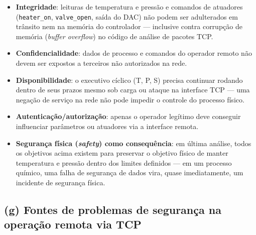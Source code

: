 \documentclass[12pt,a4paper]{article}
\newcommand{\vv}[1]{\texttt{#1}}
\begin{document}
\begin{itemize}[leftmargin=1.7cm]
  \item \textbf{Integridade}: leituras de temperatura e press\~ao e comandos de atuadores
  (\vv{heater\_on}, \vv{valve\_open}, sa\'ida do DAC) n\~ao podem ser adulterados em
  tr\^ansito nem na mem\'oria do controlador --- inclusive contra corrup\c{c}\~ao de
  mem\'oria (\emph{buffer overflow}) no c\'odigo de an\'alise de pacotes TCP.
  \item \textbf{Confidencialidade}: dados de processo e comandos do operador remoto n\~ao
  devem ser expostos a terceiros n\~ao autorizados na rede.
  \item \textbf{Disponibilidade}: o executivo c\'iclico (T, P, S) precisa continuar
  rodando dentro de seus prazos mesmo sob carga ou ataque na interface TCP --- uma nega\c{c}\~ao
  de servi\c{c}o na rede n\~ao pode impedir o controle do processo f\'isico.
  \item \textbf{Autentica\c{c}\~ao/autoriza\c{c}\~ao}: apenas o operador leg\'itimo deve
  conseguir influenciar par\^ametros ou atuadores via a interface remota.
  \item \textbf{Seguran\c{c}a f\'isica (\emph{safety}) como consequ\^encia}: em \'ultima
  an\'alise, todos os objetivos acima existem para preservar o objetivo f\'isico de manter
  temperatura e press\~ao dentro dos limites definidos --- em um processo qu\'imico, uma
  falha de seguran\c{c}a de dados vira, quase imediatamente, um incidente de seguran\c{c}a
  f\'isica.
\end{itemize}

\subsection{(g) Fontes de problemas de seguran\c{c}a na opera\c{c}\~ao remota via TCP}
\end{document}
